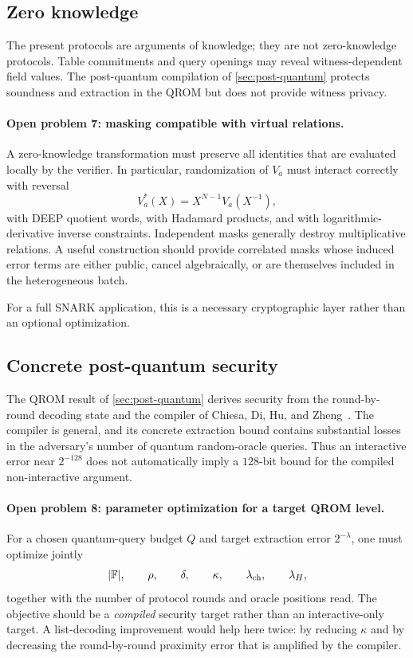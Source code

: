 \subsection{Zero knowledge}
\label{sec:limitations-zk}

The present protocols are arguments of knowledge; they are not zero-knowledge protocols.  Table commitments and query openings may reveal witness-dependent field values.  The post-quantum compilation of \cref{sec:post-quantum} protects soundness and extraction in the QROM but does not provide witness privacy.

\paragraph{Open problem 7: masking compatible with virtual relations.}
A zero-knowledge transformation must preserve all identities that are evaluated locally by the verifier.  In particular, randomization of $V_a$ must interact correctly with reversal
\[
  V_a^*(X)=X^{N-1}V_a(X^{-1}),
\]
with DEEP quotient words, with Hadamard products, and with logarithmic-derivative inverse constraints.  Independent masks generally destroy multiplicative relations.  A useful construction should provide correlated masks whose induced error terms are either public, cancel algebraically, or are themselves included in the heterogeneous batch.

For a full SNARK application, this is a necessary cryptographic layer rather than an optional optimization.

\subsection{Concrete post-quantum security}
\label{sec:limitations-pq-concrete}

The QROM result of \cref{sec:post-quantum} derives security from the round-by-round decoding state and the compiler of Chiesa, Di, Hu, and Zheng~\cite{CDHZ25}.  The compiler is general, and its concrete extraction bound contains substantial losses in the adversary's number of quantum random-oracle queries.  Thus an interactive error near $2^{-128}$ does not automatically imply a $128$-bit bound for the compiled non-interactive argument.

\paragraph{Open problem 8: parameter optimization for a target QROM level.}
For a chosen quantum-query budget $Q$ and target extraction error $2^{-\lambda}$, one must optimize jointly
\[
  |\mathbb{F}|,\qquad \rho,\qquad \delta,\qquad \kappa,\qquad
  \lambda_{\rm ch},\qquad \lambda_H,
\]
together with the number of protocol rounds and oracle positions read.  The objective should be a \emph{compiled} security target rather than an interactive-only target.  A list-decoding improvement would help here twice: by reducing $\kappa$ and by decreasing the round-by-round proximity error that is amplified by the compiler.

